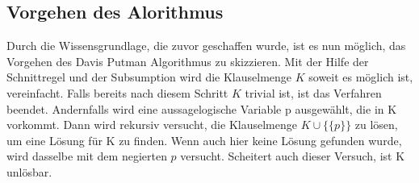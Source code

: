 \subsection{Vorgehen des Alorithmus}
Durch die Wissensgrundlage, die zuvor geschaffen wurde, ist es nun möglich, das Vorgehen des Davis Putman Algorithmus zu skizzieren. Mit der Hilfe der Schnittregel und der Subsumption wird die Klauselmenge $K$ soweit es möglich ist, vereinfacht. Falls bereits nach diesem Schritt $K$ trivial ist, ist das Verfahren beendet. Andernfalls wird eine aussagelogische Variable p ausgewählt, die in K vorkommt. Dann wird rekursiv versucht, die Klauselmenge $K \cup \bigl\{\{p\}\bigr\}$ zu lösen, um eine Lösung für K zu finden. Wenn auch hier keine Lösung gefunden wurde, wird dasselbe mit dem negierten $p$ versucht. Scheitert auch dieser Versuch, ist K unlösbar.

